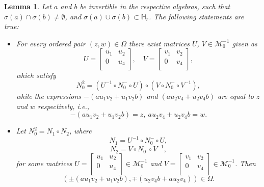 \documentclass{article}
\newtheorem{lemma}{Lemma}[section]
\theoremstyle{definition}
\def\HR{\mathbb{H}_r}
\newcommand{\mat}[4]{\left[\begin{array}{cc}#1 & #2 \\ #3 & #4 \\
	\end{array}\right]}
\begin{document}
\begin{lemma}\label{MN1N2C}  Let $a$ and $b$ be invertible in the respective algebras, such that $\sigma(a)\cap\sigma(b)\neq\emptyset$, and $\sigma(a)\cup\sigma(b)\subset\HR$. The following statements are true:
\begin{itemize}
\item[(a)] For every ordered pair $(z,w)\in\Omega$ there exist matrices $U$, $V\in\mathcal{M}^{-1}_0$ given as
$$U=\mat{u_1}{u_2}{0}{u_4},\quad V=\mat{v_1}{v_2}{0}{v_4},$$
which  satisfy
$$N_0^2=\left(U^{-1}\circ N^-_0\circ U\right)\circ\left(V\circ N^-_0\circ V^{-1}\right),$$
while the expressions $-\left(au_1v_2+u_1v_2b\right)$ and $\left(au_2v_4+u_2v_4b\right)$ are equal to $z$ and $w$ respectively, i.e., 
$$-(au_1v_2+u_1v_2b)=z,\  au_2v_4+u_2v_4b=w.$$

\item[(b)]Let $N_0^2=N_1\circ N_2$, where
$$N_1=U^{-1}\circ N^-_0\circ U,$$
$$N_2=V\circ N^-_0\circ V^{-1},$$ for some matrices $U=\mat{u_1}{u_2}{0}{u_4}\in \mathcal{M}^{-1}_0$ and $V=\mat{v_1}{v_2}{0}{v_4}\in \mathcal{M}^{-1}_0$. 
Then 
$$\left(\pm\left(au_1v_2+u_1v_2b\right), \mp\left( u_2v_4b+au_2v_4\right)\right)\in\Omega.$$
\end{itemize}
\end{lemma}
\end{document}
